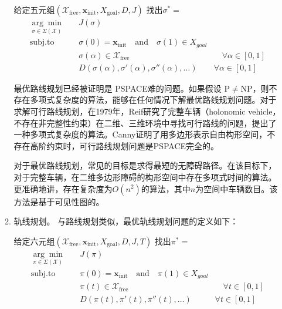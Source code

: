 \begin{enumerate}[wide=\parindent]
\begin{enumerate}[label=(\arabic*),wide=\parindent]
\begin{definition}[最优路线规划]
\label{def:path}
给定五元组$(\mathcal{X}_{\mathrm{free}}, \mathbf{x}_{\mathrm{init}}, X_{\mathrm{goal}}, D, J)$ 找出$\sigma^*=$
\begin{equation}
\begin{aligned}
\underset{\sigma\in \Sigma(\mathcal{X})}{\arg\min}\quad & J(\sigma) & \\
\mathrm{subj. to} \quad & \sigma(0)=\mathbf{x}_{\mathrm{init}} \quad \mathrm{and} \quad \sigma(1)\in X_{goal} & \\
\quad & \sigma(\alpha)\in \mathcal{X}_{\mathrm{free}} & \quad \forall \alpha\in [0,1]\\
& D(\sigma(\alpha),\sigma'(\alpha),\sigma''(\alpha), \dots) & \forall \alpha\in [0,1]
\end{aligned}
\end{equation}
\end{definition}

最优路线规划已经被证明是 PSPACE难的问题\cite{Reif1979Complexity}。如果假设 $\mathrm{P}\neq \mathrm{NP}$，则不存在多项式复杂度的算法，能够在任何情况下解最优路线规划问题。对于求解可行路线规划，在1979年，Reif\cite{Reif1979Complexity}研究了完整车辆（holonomic vehicle，不存在非完整性约束）在二维、三维环境中寻找可行路线的问题，提出了一种多项式复杂度的算法。Canny\cite{Canny1988The}证明了用多边形表示自由构形空间，不存在高阶约束时，可行路线规划问题是PSPACE完全的。

对于最优路线规划，常见的目标是求得最短的无障碍路径。在该目标下，对于完整车辆，在二维多边形障碍的构形空间中存在多项式时间的算法\cite{Storer1994Shortest,Lozano1979An}。更准确地讲，存在复杂度为$O(n^2)$的算法，其中$n$为空间中车辆数目。该方法是基于可见性图的。

\item 轨线规划。 与路线规划类似，最优轨线规划问题的定义如下：

\begin{definition}[最优轨线规划]
\label{def:trajectory}
给定六元组$(\mathcal{X}_{\mathrm{free}}, \mathbf{x}_{\mathrm{init}}, X_{\mathrm{goal}}, D, J, T)$ 找出$\pi^*=$
\begin{equation}
\begin{aligned}
\underset{\pi\in \Sigma(\mathcal{X})}{\arg\min}\quad & J(\pi) & \\
\mathrm{subj. to} \quad & \pi(0)=\mathbf{x}_{\mathrm{init}} \quad \mathrm{and} \quad \pi(1)\in X_{goal} & \\
\quad & \pi(t)\in \mathcal{X}_{\mathrm{free}} & \quad \forall t\in [0,1]\\
& D(\pi(t),\pi'(t),\pi''(t), \dots) & \forall t\in [0,1]
\end{aligned}
\end{equation}
\end{definition}


\end{enumerate}
\end{enumerate}
